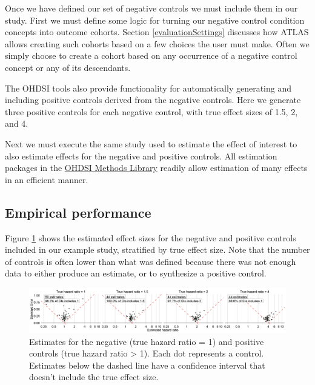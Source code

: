 \documentclass[11pt]{book}
\begin{document}
Once we have defined our set of negative controls we must include them
in our study. First we must define some logic for turning our negative
control condition concepts into outcome cohorts. Section
\ref{evaluationSettings} discusses how ATLAS allows creating such
cohorts based on a few choices the user must make. Often we simply
choose to create a cohort based on any occurrence of a negative control
concept or any of its descendants.

The OHDSI tools also provide functionality for automatically generating
and including positive controls derived from the negative controls. Here
we generate three positive controls for each negative control, with true
effect sizes of 1.5, 2, and 4.

Next we must execute the same study used to estimate the effect of
interest to also estimate effects for the negative and positive
controls. All estimation packages in the
\href{https://ohdsi.github.io/MethodsLibrary/}{OHDSI Methods Library}
readily allow estimation of many effects in an efficient manner.

\subsection{Empirical performance}\label{empirical-performance}

Figure \ref{fig:controls} shows the estimated effect sizes for the
negative and positive controls included in our example study, stratified
by true effect size. Note that the number of controls is often lower
than what was defined because there was not enough data to either
produce an estimate, or to synthesize a positive control.

\begin{figure}

{\centering \includegraphics[width=1\linewidth]{images/MethodValidity/controls} 

}

\caption{Estimates for the negative (true hazard ratio = 1) and positive controls (true hazard ratio > 1). Each dot represents a control. Estimates below the dashed line have a confidence interval that doesn't include the true effect size.}\label{fig:controls}
\end{figure}
\end{document}
